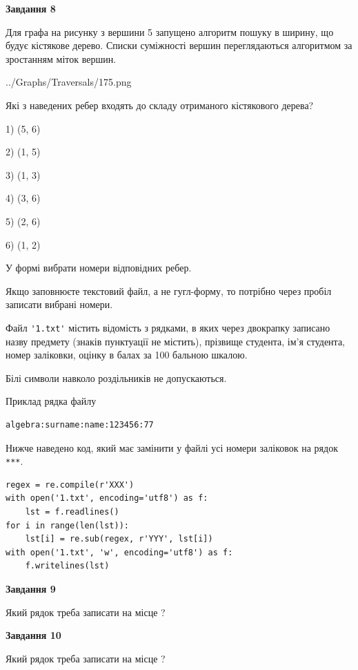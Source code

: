 \documentclass[12pt, ukrainian]{article}
\def\code#1{\Verb!#1!}
\begin{document}
{\begin {large}
{\begin {center}\textbf{Завдання 8}\end {center}}\par
Для графа на рисунку з вершини 5 запущено алгоритм пошуку в ширину, що будує кістякове дерево. Списки суміжності вершин переглядаються алгоритмом за зростанням міток вершин.\par
\begin{center}
	{../Graphs/Traversals/175.png}
\end{center}
\par Які з наведених ребер входять до складу отриманого кістякового дерева?\par
1) (5, 6)\par
2) (1, 5)\par
3) (1, 3)\par
4) (3, 6)\par
5) (2, 6)\par
6) (1, 2)\par
{\vskip 15pt} У формі вибрати номери відповідних ребер.


Якщо заповнюєте текстовий файл, а не гугл-форму, то потрібно через пробіл записа\-ти вибрані номери.\par
\newpage


Файл \code{'1.txt'} містить відомість з рядками, в яких через двокрапку записа\-но назву предмету (знаків пунктуації не містить), прізвище студента, ім'я студента, номер залі\-ков\-ки, оцінку в балах за 100 бальною шкалою.

Білі символи навколо роздільників не допускаються.

Приклад рядка файлу



\begin{verbatim}
algebra:surname:name:123456:77
\end{verbatim}


Нижче наведено код, який має замінити у файлі усі номери заліковок на рядок \code{***}.



\begin{verbatim}
regex = re.compile(r'XXX')
with open('1.txt', encoding='utf8') as f:
    lst = f.readlines()
for i in range(len(lst)):
    lst[i] = re.sub(regex, r'YYY', lst[i])
with open('1.txt', 'w', encoding='utf8') as f:
    f.writelines(lst)
\end{verbatim}




{\begin {center}\textbf{Завдання 9}\end {center}}\par
Який рядок треба записати на місце  ?\par
\vspace{5mm}


{\begin {center}\textbf{Завдання 10}\end {center}}\par
Який рядок треба записати на місце  ?\par


\newpage


\end {large}}
\end{document}
